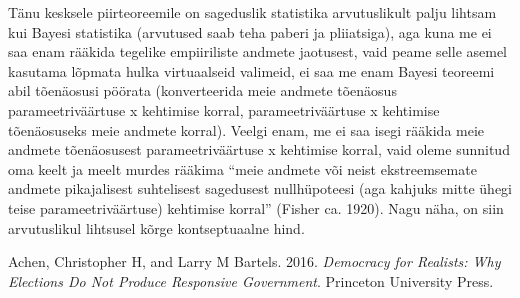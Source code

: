 \documentclass[]{book}
\begin{document}
Tänu kesksele piirteoreemile on sageduslik statistika arvutuslikult palju lihtsam kui Bayesi statistika (arvutused saab teha paberi ja pliiatsiga), aga kuna me ei saa enam rääkida tegelike empiiriliste andmete jaotusest, vaid peame selle asemel kasutama lõpmata hulka virtuaalseid valimeid, ei saa me enam Bayesi teoreemi abil tõenäosusi pöörata (konverteerida meie andmete tõenäosus parameetriväärtuse x kehtimise korral, parameetriväärtuse x kehtimise tõenäosuseks meie andmete korral). Veelgi enam, me ei saa isegi rääkida meie andmete tõenäosusest parameetriväärtuse x kehtimise korral, vaid oleme sunnitud oma keelt ja meelt murdes rääkima ``meie andmete või neist ekstreemsemate andmete pikajalisest suhtelisest sagedusest nullhüpoteesi (aga kahjuks mitte ühegi teise parameetriväärtuse) kehtimise korral'' (Fisher ca. 1920). Nagu näha, on siin arvutuslikul lihtsusel kõrge kontseptuaalne hind.

\hypertarget{refs}{}
\leavevmode\hypertarget{ref-achen2016democracy}{}%
Achen, Christopher H, and Larry M Bartels. 2016. \emph{Democracy for Realists: Why Elections Do Not Produce Responsive Government}. Princeton University Press.
\end{document}
